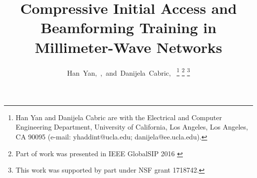 \documentclass[journal]{IEEEtran}
\begin{document}
%
\title{Compressive Initial Access and Beamforming Training in Millimeter-Wave Networks}


\author{Han~Yan,~,~and~Danijela~Cabric,~%
\thanks{Han Yan and Danijela Cabric are with the Electrical and Computer Engineering Department, University of California, Los Angeles, Los Angeles, CA 90095 (e-mail: yhaddint@ucla.edu; danijela@ee.ucla.edu).}
\thanks{Part of work was presented in IEEE GlobalSIP 2016 \cite{hyan_mmWave_CFO}}
\thanks{This work was supported by part under NSF grant 1718742.}
}







\maketitle

\end{document}
